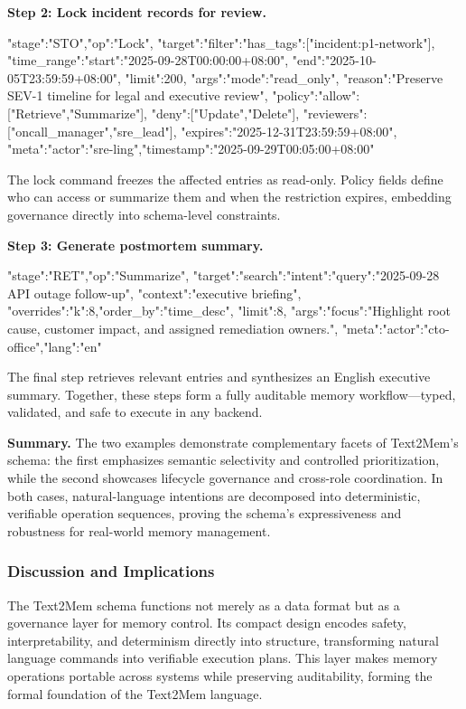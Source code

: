 \documentclass[conference]{IEEEtran}
\begin{document}
\textbf{Step 2: Lock incident records for review.}
\begin{jsonbox}
{"stage":"STO","op":"Lock",
 "target":{"filter":{"has_tags":["incident:p1-network"],
                     "time_range":{"start":"2025-09-28T00:00:00+08:00",
                                   "end":"2025-10-05T23:59:59+08:00"},
                     "limit":200}},
 "args":{"mode":"read_only",
         "reason":"Preserve SEV-1 timeline for legal and executive review",
         "policy":{"allow":["Retrieve","Summarize"],
                   "deny":["Update","Delete"],
                   "reviewers":["oncall_manager","sre_lead"],
                   "expires":"2025-12-31T23:59:59+08:00"}},
 "meta":{"actor":"sre-ling","timestamp":"2025-09-29T00:05:00+08:00"}}
\end{jsonbox}

The lock command freezes the affected entries as read-only.  
Policy fields define who can access or summarize them and when the restriction expires, embedding governance directly into schema-level constraints.

\textbf{Step 3: Generate postmortem summary.}
\begin{jsonbox}
{"stage":"RET","op":"Summarize",
 "target":{"search":{"intent":{"query":"2025-09-28 API outage follow-up",
                               "context":"executive briefing"},
                     "overrides":{"k":8,"order_by":"time_desc"},
                     "limit":8}},
 "args":{"focus":"Highlight root cause, customer impact, and assigned remediation owners."},
 "meta":{"actor":"cto-office","lang":"en"}}
\end{jsonbox}

The final step retrieves relevant entries and synthesizes an English executive summary.  
Together, these steps form a fully auditable memory workflow—typed, validated, and safe to execute in any backend.

\textbf{Summary.}
The two examples demonstrate complementary facets of Text2Mem’s schema:  
the first emphasizes semantic selectivity and controlled prioritization, while the second showcases lifecycle governance and cross-role coordination.  
In both cases, natural-language intentions are decomposed into deterministic, verifiable operation sequences, proving the schema’s expressiveness and robustness for real-world memory management.

\subsubsection{\textbf{Discussion and Implications}}
The Text2Mem schema functions not merely as a data format but as a governance layer for memory control.  
Its compact design encodes safety, interpretability, and determinism directly into structure, transforming natural language commands into verifiable execution plans.  
This layer makes memory operations portable across systems while preserving auditability, forming the formal foundation of the Text2Mem language.
\end{document}
